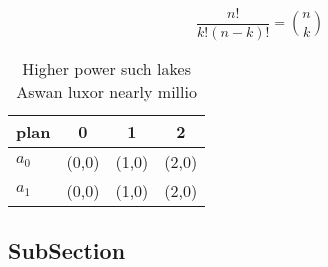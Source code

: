 \documentclass[a4paper]{article}
\begin{document}
\[ \frac{n!}{k!(n-k)!} = \binom{n}{k} \]

\begin{table}
\begin{adjustbox}{width=0.6\columnwidth}
\begin{tabular}{|l|l|l|l|}
\hline
\textbf{plan} & \multicolumn{1}{c|}{\textbf{0}} & \multicolumn{1}{c|}{\textbf{1}} & \multicolumn{1}{c|}{\textbf{2}} \\ \hline
\textbf{$a_0$}  & (0,0) & (1,0) & (2,0) \\ \hline
\textbf{$a_1$}  & (0,0) & (1,0) & (2,0) \\ \hline
\end{tabular}
\end{adjustbox}
\caption{Higher power such lakes Aswan luxor nearly millio
}
\end{table}

\subsection{SubSection}
\end{document}
